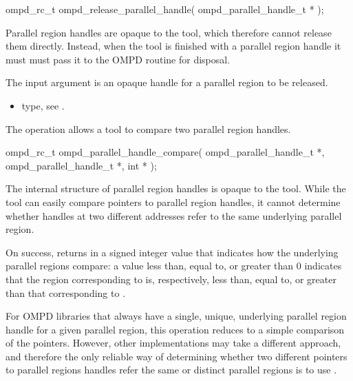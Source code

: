 \format

\cspecificstart
\begin{ompSyntax}
ompd_rc_t ompd_release_parallel_handle(
  ompd_parallel_handle_t *
);
\end{ompSyntax}
\cspecificend


\descr
Parallel region handles are opaque to the tool, which therefore
cannot release them directly. Instead, when the tool is finished with a parallel region handle
it must must pass it to the OMPD 
routine for disposal.

\argdesc
The input argument  is an opaque handle for a parallel region
to be released.

\crossreferences
\begin{itemize}
	\item {} type, see .
\end{itemize}

\label{ompd:ompd_parallel_handle_compare}
\summary
The  operation allows a tool to compare two 
parallel region handles.

\format

\cspecificstart
\begin{ompSyntax}
ompd_rc_t ompd_parallel_handle_compare(
  ompd_parallel_handle_t *,
  ompd_parallel_handle_t *,
  int *
);
\end{ompSyntax}
\cspecificend


\descr
The internal structure of parallel region handles is opaque to the tool. While the tool can easily 
compare pointers to parallel region handles, it cannot determine whether handles at two different 
addresses refer to the same underlying parallel region.

On success,  returns in  a signed 
integer value that indicates how the underlying parallel regions compare: a value less than, equal 
to, or greater than 0 indicates that the region corresponding to  is,
respectively, less than, equal to, or greater than that corresponding to .

For OMPD libraries that always have a single, unique, underlying parallel region handle for 
a given parallel region, this operation reduces to a simple comparison of the pointers. However, 
other implementations may take a different approach, and therefore the only reliable way of 
determining whether two different pointers to parallel regions handles refer the same or distinct
parallel regions is to use .

